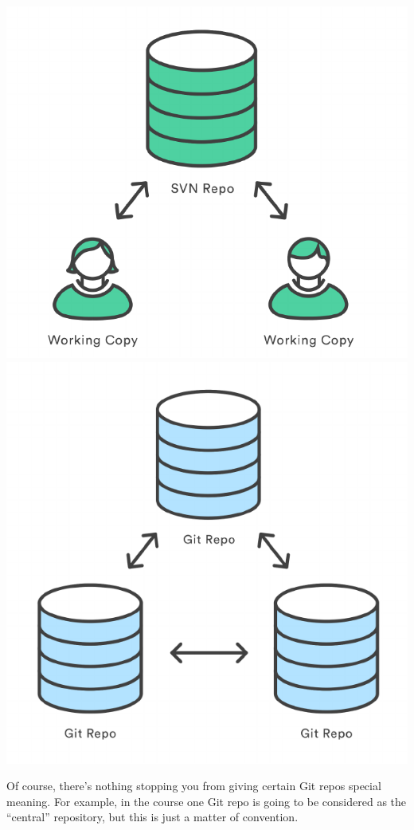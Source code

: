 \documentclass{article}
\begin{document}
\begin{center}
\includegraphics[scale=0.5]{figures/02.pdf}
\includegraphics[scale=0.5]{figures/03.pdf}
\end{center}

Of course, there's nothing stopping you from giving certain Git repos
special meaning. For example, in the course one Git repo is going to be
considered as the “central” repository, but this is just a matter of
convention.
\end{document}
